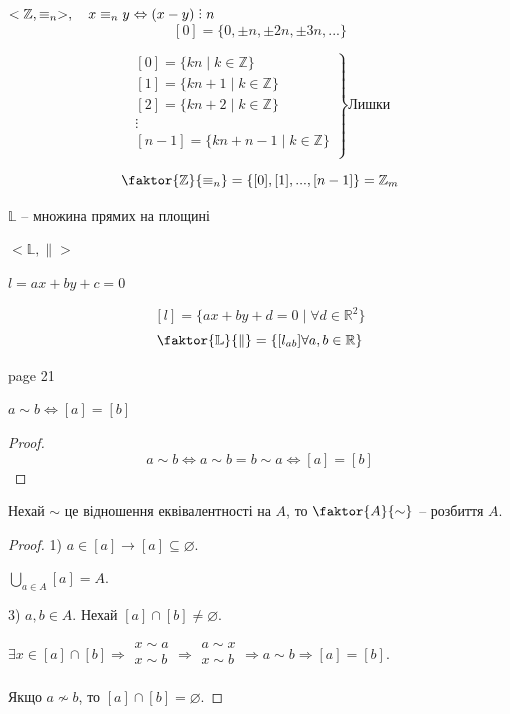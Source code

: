 \begin{example}
    $<\mathbb{Z}, \equiv_{n}>, \quad x \equiv_{n} y \Leftrightarrow (x - y) \divby n$
    $$[0] = \{ 0, \pm n, \pm 2n, \pm 3n, ... \}$$

    $$ \left. \begin{matrix}
        [0] = \{ kn \mid k \in \mathbb{Z} \}  \\
        [1] = \{ kn + 1 \mid k \in \mathbb{Z} \}  \\
        [2] = \{ kn + 2 \mid k \in \mathbb{Z} \}  \\
        \vdots  \\
        [n-1] = \{ kn + n - 1 \mid k \in \mathbb{Z} \}  \\
    \end{matrix} \right\} \text{Лишки}$$
    
    $$\faktor{\mathbb{Z}}{\equiv_n} = \{ [0], [1], ..., [n-1] \} = \mathbb{Z}_m$$
\end{example}

\begin{example}
    $\mathbb{L}$ -- множина прямих на площині

    $<\mathbb{L}, \parallel>$

    $l = ax + by + c = 0$

    $$[l] = \{ax + by + d = 0 \mid \forall  d \in \mathbb{R}^2\}$$
    $$\faktor{\mathbb{L}}{\parallel} = \{ [l_{ab}] \forall a, b \in \mathbb{R}  \}$$
\end{example}

page 21

\begin{lemma}
    $a \sim b \Leftrightarrow [a] = [b]$
\end{lemma}
\begin{proof}
    $$a \sim b \Leftrightarrow a \sim b = b \sim a \Leftrightarrow [a] = [b]$$
\end{proof}

\begin{theorem}
    Нехай $\sim$ це відношення еквівалентності
    на $A$, то $\faktor{A}{\sim}$ -- розбиття $A$.
\end{theorem}
\begin{proof}
    1) $a \in [a] \rightarrow [a] \subseteq \varnothing$.

    $\bigcup\limits_{a \in A} [a] = A$.

    3) $a, b \in A$. Нехай $[a] \cap [b] \neq \varnothing$.

    $\exists x \in [a] \cap [b] \Rightarrow \begin{array}{l}
        x \sim a  \\
        x \sim b  \\
    \end{array} \Rightarrow \begin{array}{l}
        a \sim x  \\
        x \sim b  \\
    \end{array} \Rightarrow a \sim b \Rightarrow [a] = [b].$
    
    Якщо $a \not\sim b$, то $[a] \cap [b] = \varnothing$.
\end{proof}

